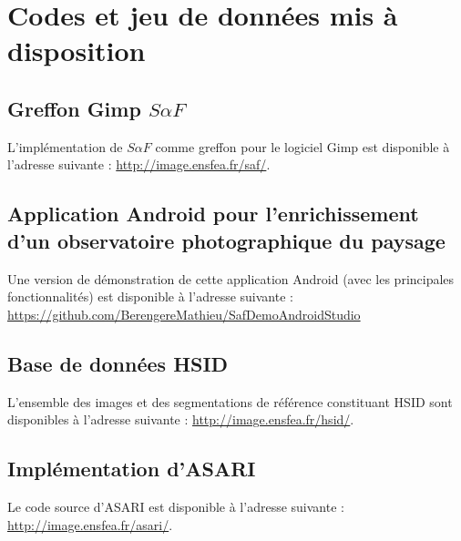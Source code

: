 \chapter{Codes et jeu de données mis à disposition}
 
\section{Greffon Gimp $S \alpha F$}

L'implémentation de $S \alpha F$ comme greffon pour le logiciel Gimp est disponible à l'adresse suivante : \url{http://image.ensfea.fr/saf/}.

\section{Application Android pour l'enrichissement d'un observatoire photographique du paysage}

Une version de démonstration de cette application Android (avec les principales fonctionnalités) est disponible à l'adresse suivante : \url{https://github.com/BerengereMathieu/SafDemoAndroidStudio}

\section{Base de données HSID}

L'ensemble des images et des segmentations de référence constituant HSID sont disponibles à l'adresse suivante : 
\url{http://image.ensfea.fr/hsid/}. 

\section{Implémentation d'ASARI}

Le code source d'ASARI est disponible à l'adresse suivante : \url{http://image.ensfea.fr/asari/}.